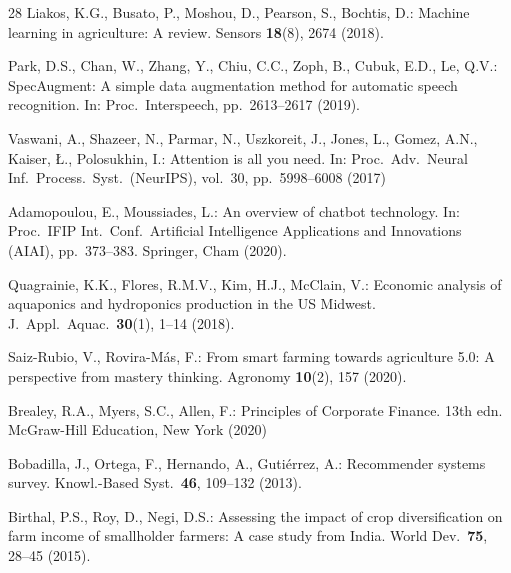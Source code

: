 \documentclass[runningheads]{llncs}
\begin{document}
\begin{thebibliography}{28}
Liakos, K.G., Busato, P., Moshou, D., Pearson, S., Bochtis, D.:
Machine learning in agriculture: A review.
Sensors \textbf{18}(8), 2674 (2018). 

Park, D.S., Chan, W., Zhang, Y., Chiu, C.C., Zoph, B.,
Cubuk, E.D., Le, Q.V.:
SpecAugment: A simple data augmentation method for automatic speech
recognition. In: Proc.\ Interspeech, pp.\ 2613--2617 (2019).

Vaswani, A., Shazeer, N., Parmar, N., Uszkoreit, J., Jones, L.,
Gomez, A.N., Kaiser, {\L}., Polosukhin, I.:
Attention is all you need.
In: Proc.\ Adv.\ Neural Inf.\ Process.\ Syst.\ (NeurIPS),
vol.\ 30, pp.\ 5998--6008 (2017)

Adamopoulou, E., Moussiades, L.:
An overview of chatbot technology.
In: Proc.\ IFIP Int.\ Conf.\ Artificial Intelligence Applications
and Innovations (AIAI), pp.\ 373--383. Springer, Cham (2020).

Quagrainie, K.K., Flores, R.M.V., Kim, H.J., McClain, V.:
Economic analysis of aquaponics and hydroponics production in
the US Midwest.
J.\ Appl.\ Aquac.\ \textbf{30}(1), 1--14 (2018).

Saiz-Rubio, V., Rovira-M\'{a}s, F.:
From smart farming towards agriculture 5.0: A perspective from
mastery thinking.
Agronomy \textbf{10}(2), 157 (2020). 

Brealey, R.A., Myers, S.C., Allen, F.:
Principles of Corporate Finance. 13th edn.
McGraw-Hill Education, New York (2020)

Bobadilla, J., Ortega, F., Hernando, A., Guti\'{e}rrez, A.:
Recommender systems survey.
Knowl.-Based Syst.\ \textbf{46}, 109--132 (2013).

Birthal, P.S., Roy, D., Negi, D.S.:
Assessing the impact of crop diversification on farm income of
smallholder farmers: A case study from India.
World Dev.\ \textbf{75}, 28--45 (2015).

\end{thebibliography}
\end{document}
